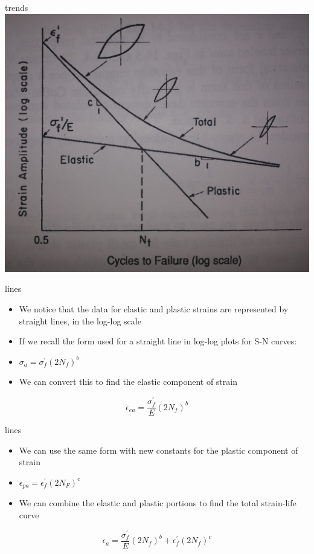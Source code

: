\documentclass[
  letterpaper,
  ignorenonframetext,
  aspectratio=43,
  handout,
  12pt]{beamer}
\providecommand{\tightlist}{%
  \setlength{\itemsep}{0pt}\setlength{\parskip}{0pt}}
\providecommand{\tightlist}{%
\setlength{\itemsep}{0pt}\setlength{\parskip}{0pt}}
\let\Oldincludegraphics\includegraphics
\renewcommand{\includegraphics}[2][]{\Oldincludegraphics[width=\textwidth,height=0.7\textheight,keepaspectratio]{#2}}
\begin{document}
\begin{frame}{trends}
\protect\hypertarget{trends}{}
\includegraphics{../images/elastic-plastic.jpg}
\end{frame}

\begin{frame}{lines}
\protect\hypertarget{lines}{}
\begin{itemize}
\tightlist
\item
  We notice that the data for elastic and plastic strains are
  represented by straight lines, in the log-log scale
\item
  If we recall the form used for a straight line in log-log plots for
  S-N curves:
\item
  \(\sigma_a = \sigma_f^\prime (2 N_f)^b\)
\item
  We can convert this to find the elastic component of strain
\end{itemize}

\[\epsilon_{ea} = \frac{\sigma_f^\prime}{E} (2N_f)^b\]
\end{frame}

\begin{frame}{lines}
\protect\hypertarget{lines-1}{}
\begin{itemize}
\tightlist
\item
  We can use the same form with new constants for the plastic component
  of strain
\item
  \(\epsilon_{pa} = \epsilon_f^\prime(2N_F)^c\)
\item
  We can combine the elastic and plastic portions to find the total
  strain-life curve
\end{itemize}

\[\epsilon_a = \frac{\sigma_f^\prime}{E} (2N_f)^b + \epsilon_f^\prime (2 N_f)^c\]
\end{frame}
\end{document}
